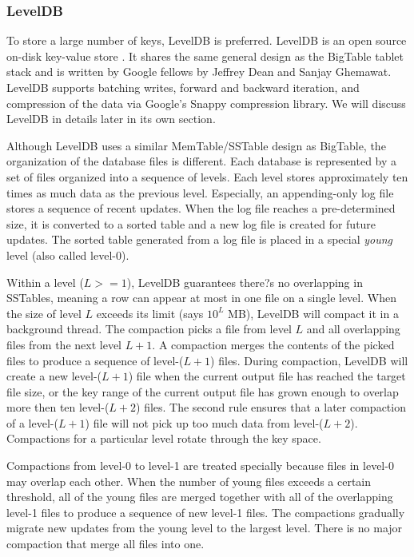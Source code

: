 \documentclass[11pt]{book}
\begin{document}
\subsubsection{LevelDB}
To store a large number of keys, LevelDB is preferred. LevelDB is an open source on-disk key-value store \cite{LevelDB}. It shares the same general design as the BigTable tablet stack and is written by Google fellows by Jeffrey Dean and Sanjay Ghemawat. LevelDB supports batching writes, forward and backward iteration, and compression of the data via Google's Snappy compression library. We will discuss LevelDB in details later in its own section.

Although LevelDB uses a similar MemTable/SSTable design as BigTable, the organization of the database files is different. Each database is represented by a set of files organized into a sequence of levels. Each level stores approximately ten times as much data as the previous level. Especially, an appending-only log file stores a sequence of recent updates. When the log file reaches a pre-determined size, it is converted to a sorted table and a new log file is created for future updates. The sorted table generated from a log file is placed in a special {\em young} level (also called level-0).

Within a level ($L > =1$), LevelDB guarantees there?s no overlapping in SSTables, meaning a row can appear at most in one file on a single level. When the size of level $L$ exceeds its limit (says $10^L$ MB), LevelDB will compact it in a background thread. The compaction picks a file from level $L$ and all overlapping files from the next level $L+1$. A compaction merges the contents of the picked files to produce a sequence of level-($L+1$) files. During compaction, LevelDB will create a new level-($L+1$) file when the current output file has reached the target file size, or the key range of the current output file has grown enough to overlap more then ten level-($L+2$) files. The second rule ensures that a later compaction of a level-($L+1$) file will not pick up too much data from level-($L+2$). Compactions for a particular level rotate through the key space. 

Compactions from level-0 to level-1 are treated specially because files in level-0 may overlap each other. When the number of young files exceeds a certain threshold, all of the young files are merged together with all of the overlapping level-1 files to produce a sequence of new level-1 files. The compactions gradually migrate new updates from the young level to the largest level. There is no major compaction that merge all files into one.
\end{document}

